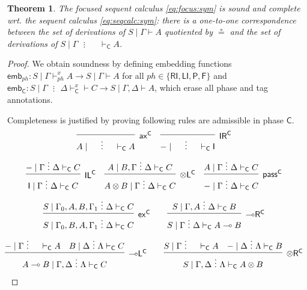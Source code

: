 \documentclass[copyright,creativecommons]{eptcs}
\newtheorem{theorem}{Theorem}[section]
\theoremstyle{definition}
\newcommand{\tl}{\otimes \mathsf{L}}
\newcommand{\tr}{\otimes \mathsf{R}}
\newcommand{\lright}{{\multimap}\mathsf{R}}
\newcommand{\lleft}{{\multimap}\mathsf{L}}
\newcommand{\pass}{\mathsf{pass}}
\newcommand{\unitl}{\mathsf{IL}}
\newcommand{\unitr}{\mathsf{IR}}
\newcommand{\ax}{\mathsf{ax}}
\newcommand{\ot}{\otimes}
\newcommand{\lolli}{\multimap}
\newcommand{\I}{\mathsf{I}}
\newcommand{\C}{\mathsf{C}}
\newcommand{\RI}{\mathsf{RI}}
\newcommand{\LI}{\mathsf{LI}}
\newcommand{\Pass}{\mathsf{P}}
\newcommand{\F}{\mathsf{F}}
\newcommand{\ex}{\mathsf{ex}}
\newcommand{\spl}{\text{ } \vdots \text{ }}
\begin{document}
\begin{theorem}
  The focused sequent calculus \ref{eq:focus:sym} is sound and complete wrt. the sequent calculus \ref{eq:seqcalc:sym}: there is a one-to-one correspondence between the set of derivations of $S \mid \Gamma \vdash A$ quotiented by $\circeq$ and the set of derivations of $S \mid \Gamma \spl \quad \vdash_{\C} A$.
\end{theorem}
\begin{proof}
  We obtain soundness by defining embedding functions $\mathsf{emb}_{ph} : S \mid \Gamma \vdash^{x}_{ph} A \to S \mid \Gamma \vdash A$ for all $ph \in \{ \RI , \LI , \Pass , \F \}$ and $\mathsf{emb}_{\C} : S \mid \Gamma \spl \Delta \vdash^{x}_{\C} \vdash C \to S \mid \Gamma , \Delta \vdash A$, which erase all phase and tag annotations.

  Completeness is justified by proving following rules are admissible in phase $\C$.
  \begin{equation}\label{eq:admis:sym}
    \hspace*{-4mm}
      \begin{array}{c}
        \infer[\ax^{\C}]{A \mid \quad \spl \quad \vdash_{\C} A}{}
        \quad
        \infer[\unitr^{\C}]{{-} \mid \quad \spl \quad \vdash_{\C} \I}{}
    \\[6pt]
    \infer[\unitl^{\C}]{\I \mid \Gamma \spl \Delta \vdash_{\C} C}{{-} \mid \Gamma \spl \Delta \vdash_{\C} C}
    \quad
    \infer[\tl^{\C}]{A \ot B \mid \Gamma \spl \Delta \vdash_{\C} C}{A \mid B, \Gamma \spl \Delta \vdash_{\C} C}
    \quad
    \infer[\pass^{\C}]{{-} \mid \Gamma \spl \Delta \vdash_{\C} C}{A \mid \Gamma \spl \Delta \vdash_{\C} C}
    \\[6pt]
        \infer[\ex^{\C}]{S \mid \Gamma_0 , B , A , \Gamma_1 \spl \Delta \vdash_{\C} C}{
          S \mid \Gamma_0 , A , B , \Gamma_1 \spl \Delta \vdash_{\C} C
        }
        \qquad
        \infer[\lright^{\C}]{S \mid \Gamma \spl \Delta \vdash_{\C} A \lolli B}{
          S \mid \Gamma , A \spl \Delta \vdash_{\C} B
        }
    \\[6pt]
        \infer[\lleft^{\C}]{A \lolli B \mid \Gamma , \Delta \spl \Lambda \vdash_{\C} C}{
        {-} \mid \Gamma \spl \quad \vdash_{\C} A
        &
        B \mid \Delta \spl \Lambda \vdash_{\C} C
        }
        \qquad
        \infer[\tr^{\C}]{S \mid \Gamma , \Delta  \spl \Lambda \vdash_{\C} A \ot B}{
          S \mid \Gamma \spl \quad  \vdash_{\C} A
          &
          {-} \mid \Delta \spl \Lambda \vdash_{\C} B
        }
      \end{array}

\end{equation}
\end{proof}
\end{document}
